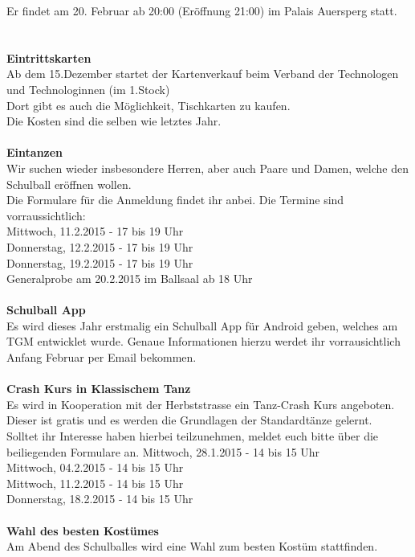 \documentclass[12pt]{article}
\begin{document}
Er findet am 20. Februar ab 20:00 (Eröffnung 21:00) im Palais Auersperg statt.\\
\\ \\
\textbf{Eintrittskarten} \\
Ab dem 15.Dezember startet der Kartenverkauf beim  Verband der Technologen und Technologinnen (im 1.Stock) \\
Dort gibt es auch die Möglichkeit, Tischkarten zu kaufen. \\
Die Kosten sind die selben wie letztes Jahr.
\\ \\
\textbf{Eintanzen} \\
Wir suchen wieder insbesondere Herren, aber auch Paare und Damen, welche den Schulball eröffnen wollen. \\
Die Formulare für die Anmeldung findet ihr anbei. Die Termine sind vorraussichtlich: \\
Mittwoch, 11.2.2015 - 17 bis 19 Uhr \\ 
Donnerstag, 12.2.2015 - 17 bis 19 Uhr \\
Donnerstag, 19.2.2015 - 17 bis 19 Uhr \\
Generalprobe am 20.2.2015 im Ballsaal ab 18 Uhr \\ \\
\textbf{Schulball App} \\
Es wird dieses Jahr erstmalig ein Schulball App für Android geben, welches am TGM entwicklet wurde. Genaue Informationen hierzu werdet ihr vorrausichtlich Anfang Februar per Email bekommen.
\\ \\
\textbf{Crash Kurs in Klassischem Tanz} \\
Es wird in Kooperation mit der Herbststrasse ein Tanz-Crash Kurs angeboten. Dieser ist gratis und es werden die Grundlagen der Standardtänze gelernt. \\
Solltet ihr Interesse haben hierbei teilzunehmen, meldet euch bitte über die beiliegenden Formulare an. Mittwoch, 28.1.2015 - 14 bis 15 Uhr \\ 
Mittwoch, 04.2.2015 - 14 bis 15 Uhr \\ 
Mittwoch, 11.2.2015 - 14 bis 15 Uhr \\
Donnerstag, 18.2.2015 - 14 bis 15 Uhr 
\\ \\
\textbf{Wahl des besten Kostümes} \\
Am Abend des Schulballes wird eine Wahl zum besten Kostüm stattfinden. \\
\end{document}
